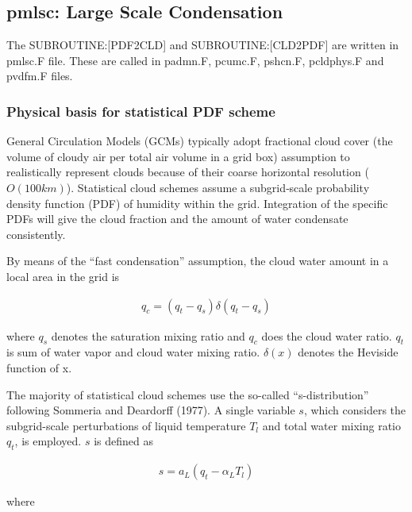 \hypertarget{pmlsc-large-scale-condensation}{%
\subsection{pmlsc: Large Scale
Condensation}\label{pmlsc-large-scale-condensation}}

The SUBROUTINE:{[}PDF2CLD{]} and SUBROUTINE:{[}CLD2PDF{]} are written in
pmlsc.F file. These are called in padmn.F, pcumc.F, pshcn.F, pcldphys.F
and pvdfm.F files.

\hypertarget{physical-basis-for-statistical-pdf-scheme}{%
\subsubsection{Physical basis for statistical PDF
scheme}\label{physical-basis-for-statistical-pdf-scheme}}

General Circulation Models (GCMs) typically adopt fractional cloud cover
(the volume of cloudy air per total air volume in a grid box) assumption
to realistically represent clouds because of their coarse horizontal
resolution (\(O(100km)\)). Statistical cloud schemes assume a
subgrid‐scale probability density function (PDF) of humidity within the
grid. Integration of the specific PDFs will give the cloud fraction and
the amount of water condensate consistently.

By means of the ``fast condensation'' assumption, the cloud water amount
in a local area in the grid is

\begin{eqnarray}
q_{c}=\left(q_{t}-q_{s}\right) \delta\left(q_{t}-q_{s}\right)
\label{hpc.1}
\end{eqnarray}

where \(q_s\) denotes the saturation mixing ratio and \(q_c\) does the
cloud water ratio. \(q_t\) is sum of water vapor and cloud water mixing
ratio. \(\delta(x)\) denotes the Heviside function of x.

The majority of statistical cloud schemes use the so-called
``s-distribution'' following Sommeria and Deardorff (1977). A single
variable \(s\), which considers the subgrid-scale perturbations of
liquid temperature \(T_l\) and total water mixing ratio \(q_t\), is
employed. \(s\) is defined as

\begin{eqnarray}
s=a_{L}\left(q_{t}-\alpha_{L} T_{l}\right)
\end{eqnarray}

where

